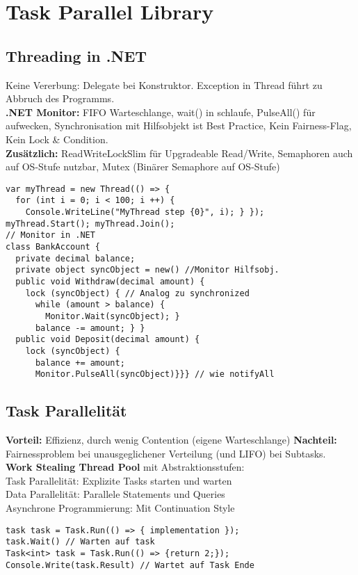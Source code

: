 
\section{Task Parallel Library}
\subsection{Threading in .NET}
Keine Vererbung: Delegate bei Konstruktor. Exception in Thread führt zu Abbruch des Programms.\\
\textcolor{b}{\textbf{.NET Monitor:}} FIFO Warteschlange, \textcolor{b}{wait()} in schlaufe, \textcolor{b}{PulseAll()} für aufwecken, Synchronisation mit Hilfsobjekt ist Best Practice, Kein Fairness-Flag, Kein Lock \& Condition.\\
\textcolor{b}{\textbf{Zusätzlich:}} ReadWriteLockSlim für Upgradeable Read/Write, Semaphoren auch auf OS-Stufe nutzbar, Mutex (Binärer Semaphore auf OS-Stufe)
\begin{lstlisting}
var myThread = new Thread(() => {
  for (int i = 0; i < 100; i ++) {
    Console.WriteLine("MyThread step {0}", i); } });
myThread.Start(); myThread.Join();
// Monitor in .NET
class BankAccount {
  private decimal balance;
  private object syncObject = new() //Monitor Hilfsobj.
  public void Withdraw(decimal amount) {
    lock (syncObject) { // Analog zu synchronized
      while (amount > balance) {
        Monitor.Wait(syncObject); }
      balance -= amount; } }
  public void Deposit(decimal amount) {
    lock (syncObject) {
      balance += amount;
      Monitor.PulseAll(syncObject)}}} // wie notifyAll
\end{lstlisting}
\subsection{Task Parallelität}
\textbf{Vorteil:} Effizienz, durch wenig Contention (eigene Warteschlange) \textbf{Nachteil:} Fairnessproblem bei unausgeglichener Verteilung (und LIFO) bei Subtasks.\\
\textcolor{b}{\textbf{Work Stealing Thread Pool}} mit Abstraktionsstufen:\\
Task Parallelität: Explizite Tasks starten und warten\\
Data Parallelität: Parallele Statements und Queries\\
Asynchrone Programmierung: Mit Continuation Style
\begin{lstlisting}
task task = Task.Run(() => { implementation });
task.Wait() // Warten auf task
Task<int> task = Task.Run(() => {return 2;});
Console.Write(task.Result) // Wartet auf Task Ende
\end{lstlisting}
